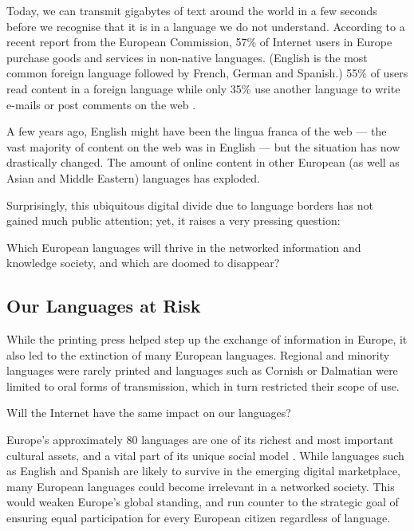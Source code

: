 \begin{multicols}{2}
Today, we can transmit gigabytes of text around the world in a few seconds before we recognise that it is in a language we do not understand. According to a recent report from the European Commission, 57\% of Internet users in Europe purchase goods and services in non-native languages. (English is the most common foreign language followed by French, German and Spanish.) 55\% of users read content in a foreign language while only 35\% use another language to write e-mails or post comments on the web \cite{EC1}. 

A few years ago, English might have been the lingua franca of the web — the vast majority of content on the web was in English — but the situation has now drastically changed. The amount of online content in other European (as well as Asian and Middle Eastern) languages has exploded.

Surprisingly, this ubiquitous digital divide due to language borders has not gained much public attention; yet, it raises a very pressing question: 

Which European languages will thrive in the networked information and knowledge society, and which are doomed to disappear?

\subsection{Our Languages at Risk}

While the printing press helped step up the exchange of information in Europe, it also led to the extinction of many European languages. Regional and minority languages were rarely printed and languages such as Cornish or Dalmatian were limited to oral forms of transmission, which in turn restricted their scope of use. 

Will the Internet have the same impact on our languages?

 Europe’s approximately 80 languages are one of its richest and most important cultural assets, and a vital part of its unique social model \cite{EC2}. While languages such as English and Spanish are likely to survive in the emerging digital marketplace, many European languages could become irrelevant in a networked society. This would weaken Europe’s global standing, and run counter to the strategic goal of ensuring equal participation for every European citizen regardless of language. 



\end{multicols}
